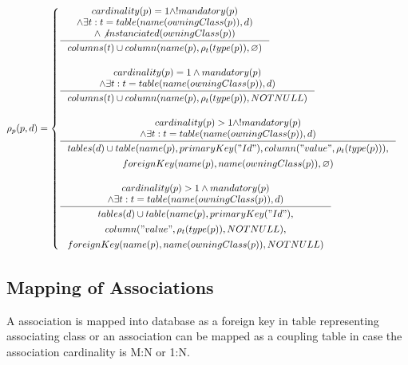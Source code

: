 \documentclass[11pt]{article}
\begin{document}
$\rho_p(p, d) = \begin{cases}
  \inference{cardinality(p) = 1 \wedge ! mandatory(p)
 \\ \wedge \exists t : t = table(name(owningClass(p)), d) 
 \\ \wedge \not instanciated(owningClass(p))
 }{\begin{gathered}
	  columns(t) \cup column(name(p), \rho_t(type(p)), \varnothing )
\end{gathered}
 } \\ \\

  \inference{cardinality(p) = 1 \wedge mandatory(p)
 \\ \wedge \exists t : t = table(name(owningClass(p)), d)}{\begin{gathered}
 	 columns(t) \cup column(name(p), \rho_t(type(p)), NOTNULL ) \\
 	
 	
\end{gathered}
} 
\\ \\
 
 \inference{ cardinality(p) > 1 \wedge ! mandatory(p) \\ \wedge \exists t : t = table(name(owningClass(p)), d)}{\begin{gathered}tables(d) \cup  table(name(p), primaryKey("Id"), column("value", \rho_t(type(p))), \\ foreignKey(name(p), name(owningClass(p)), \varnothing) \\
 
\end{gathered}}
\\ \\

 \inference{ cardinality(p) > 1 \wedge mandatory(p) \\ \wedge \exists t : t = table(name(owningClass(p)), d) }{\begin{gathered} tables(d) \cup  table(name(p), primaryKey("Id"), \\ column("value", \rho_t(type(p)), NOTNULL), \\ foreignKey(name(p), name(owningClass(p)), NOTNULL)
	 \end{gathered}}
 \end{cases}$

\subsection{Mapping of Associations}
A association is mapped into database as a foreign key in table representing associating class or an association can be mapped as a coupling table in case the association cardinality is M:N or 1:N.
\end{document}
